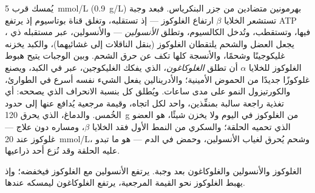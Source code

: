 \begin{proposition}\label{prop:b2:cell-signalling:glucose}
يُمسك  قرب \qty{5}{mmol/L} (\qty{0.9}{g/L})
بهرمونين متضادين من جزر البنكرياس. فبعد وجبة
تستشعر الخلايا $\beta$ ارتفاع الغلوكوز --- إذ
تستقلبه، وتغلق قناة بوتاسيوم إذ يرتفع ATP فيها،
وتستقطب، وتُدخل الكالسيوم، وتطلق \emph{الأنسولين} --- والأنسولين،
عبر مستقبله ذي ، يجعل العضل والشحم يلتقطان
الغلوكوز (بنقل الناقلات إلى غشائيهما)، والكبد
يخزنه غليكوجينًا وشحمًا، والأنسجة كلها تكف عن حرق الشحم.
وبين الوجبات يتيح هبوط الغلوكوز للخلايا $\alpha$ أن تطلق
\emph{الغلوكاغون}، الذي يفكك الغليكوجين، عبر  في الكبد،
ويصنع غلوكوزًا جديدًا من الحموض الأمينية؛ والأدرينالين يفعل الشيء
نفسه أسرع في الطوارئ، والكورتيزول  النمو على مدى
ساعات. ويُطلق كل  بنسبة الانحراف الذي
يصححه: أي تغذية راجعة سالبة بمنفِّذين، واحد لكل
اتجاه، وقيمة مرجعية يُدافع عنها إلى حدود الخُمس. والدماغ،
الذي يحرق \qty{120}{g} من الغلوكوز في اليوم ولا يخزن شيئًا، هو
العضو الذي تحميه الحلقة؛ والسكري من النمط الأول فقد
الخلايا $\beta$، ومساره دون علاج --- غلوكوز عند
\qty{20}{mmol/L}، وشحم يُحرق لغياب الأنسولين، وحمض في الدم
--- هو ما تبدو عليه الحلقة وقد نُزع أحد ذراعيها.
\end{proposition}

\begin{omfigure}

{\small الغلوكوز والأنسولين والغلوكاغون بعد وجبة. يرتفع الأنسولين
مع الغلوكوز فيخفضه؛ وإذ يهبط الغلوكوز نحو القيمة
المرجعية، يرتفع الغلوكاغون ليمسكه عندها.}
\end{omfigure}

